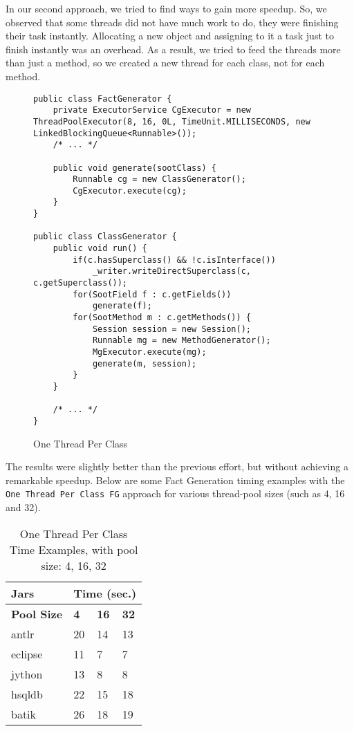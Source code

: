 \documentclass{dithesis}
\begin{document}
        In our second approach, we tried to find ways to gain more speedup. So, we observed that some threads did not have much work to do, they were finishing their task instantly. Allocating a new object and assigning to it a task just to finish instantly was an overhead. As a result, we tried to feed the threads more than just a method, so we created a new thread for each class, not for each method.
        \begin{figure}[H]
\begin{lstlisting}
public class FactGenerator {
    private ExecutorService CgExecutor = new ThreadPoolExecutor(8, 16, 0L, TimeUnit.MILLISECONDS, new LinkedBlockingQueue<Runnable>());
    /* ... */

    public void generate(sootClass) {
        Runnable cg = new ClassGenerator();
        CgExecutor.execute(cg);
    }
}

public class ClassGenerator {
    public void run() {
        if(c.hasSuperclass() && !c.isInterface())
            _writer.writeDirectSuperclass(c, c.getSuperclass());
        for(SootField f : c.getFields())
            generate(f);
        for(SootMethod m : c.getMethods()) {
            Session session = new Session();
            Runnable mg = new MethodGenerator();
            MgExecutor.execute(mg);
            generate(m, session);
        }
    }

    /* ... */
}
\end{lstlisting}
        \caption{One Thread Per Class}
        \end{figure}

        The results were slightly better than the previous effort, but without achieving a remarkable speedup. Below are some Fact Generation timing examples with the \texttt{One Thread Per Class FG} approach for various thread-pool sizes (such as 4, 16 and 32).
        \begin{table}[H]
			\centering
            \begin{tabular}{@{}l|lll@{}}
            \toprule
            \textbf{Jars}    	& \multicolumn{3}{l}{\textbf{Time (sec.)}}  \\ \midrule
            \textbf{Pool Size} 	& \textbf{4}  & \textbf{16}  & \textbf{32}  \\ \midrule
            antlr            	& 20          & 14           & 13           \\
            eclipse          	& 11          & 7            & 7            \\
            jython           	& 13          & 8            & 8            \\
            hsqldb           	& 22          & 15           & 18           \\
            batik            	& 26          & 18           & 19           \\ \bottomrule
            \end{tabular}
            \newline
			\caption[One Thread Per Class Time Examples]{One Thread Per Class Time Examples, with pool size: 4, 16, 32}
		\end{table}
\end{document}
